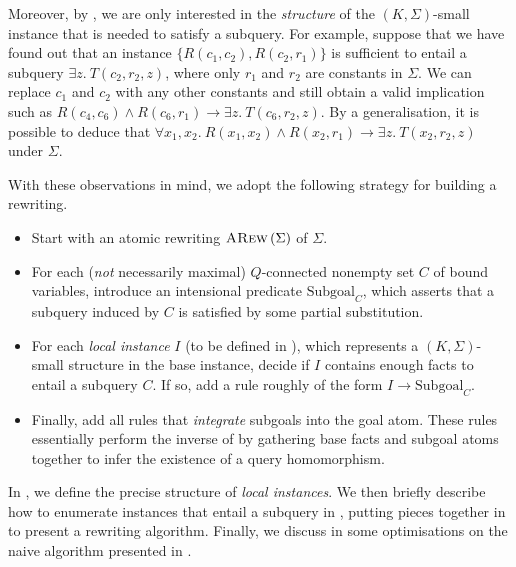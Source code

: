 \documentclass[12pt]{report}
\theoremstyle{plain}
\theoremstyle{definition}
\newcommand{\ARew}[1]{\ensuremath{\normalfont{\textsc{ARew}} \left( #1 \right)}}
\begin{document}
Moreover, by , we are only interested in the \emph{structure} of the $(K, \Sigma)$-small instance that is needed to satisfy a subquery. For example, suppose that we have found out that an instance $\{R(c_1, c_2), R(c_2, r_1)\}$ is sufficient to entail a subquery $\exists z.\ T(c_2, r_2, z)$, where only $r_1$ and $r_2$ are constants in $\Sigma$. We can replace $c_1$ and $c_2$ with any other constants and still obtain a valid implication such as $R(c_4, c_6) \wedge R(c_6, r_1) \rightarrow \exists z.\ T(c_6, r_2, z)$. By a generalisation, it is possible to deduce that $\forall x_1, x_2.\ R(x_1, x_2) \wedge R(x_2, r_1) \rightarrow \exists z.\ T(x_2, r_2, z)$ under $\Sigma$.

With these observations in mind, we adopt the following strategy for building a rewriting.

\begin{itemize}
  \item Start with an atomic rewriting $\ARew{\Sigma}$ of $\Sigma$.
  \item For each (\emph{not} necessarily maximal) $Q$-connected nonempty set $C$ of bound variables, introduce an intensional predicate $\mathrm{Subgoal}_C$, which asserts that a subquery induced by $C$ is satisfied by some partial substitution.
  \item For each \emph{local instance} $I$ (to be defined in ), which represents a $(K, \Sigma)$-small structure in the base instance, decide if $I$ contains enough facts to entail a subquery $C$. If so, add a rule roughly of the form $I \rightarrow \mathrm{Subgoal}_C$.
  \item Finally, add all rules that \emph{integrate} subgoals into the goal atom. These rules essentially perform the inverse of  by gathering base facts and subgoal atoms together to infer the existence of a query homomorphism.
\end{itemize}

In , we define the precise structure of \emph{local instances}. We then briefly describe how to enumerate instances that entail a subquery in , putting pieces together in  to present a rewriting algorithm. Finally, we discuss in  some optimisations on the naive algorithm presented in .
\end{document}
